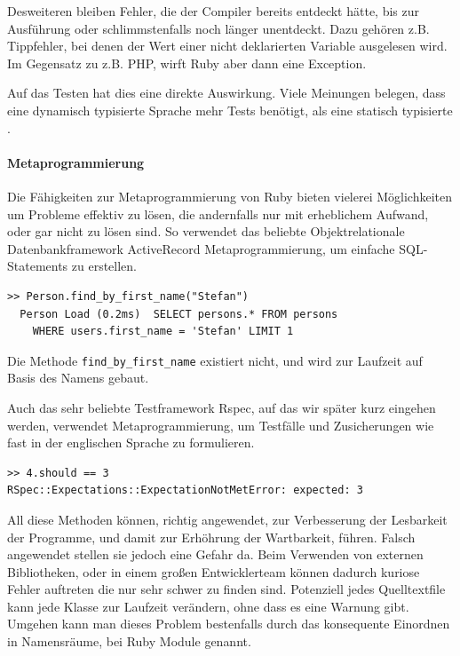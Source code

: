 Desweiteren bleiben Fehler, die der Compiler bereits entdeckt hätte, bis zur Ausführung oder schlimmstenfalls noch länger unentdeckt. Dazu gehören z.B. Tippfehler, bei denen der Wert einer nicht deklarierten Variable ausgelesen wird. Im Gegensatz zu z.B. PHP, wirft Ruby aber dann eine Exception.

Auf das Testen hat dies eine direkte Auswirkung. Viele Meinungen belegen, dass eine dynamisch typisierte Sprache mehr Tests benötigt, als eine statisch typisierte \citep{daniel_spiewak_dynamic_2010}. 



\paragraph{Metaprogrammierung}
Die Fähigkeiten zur Metaprogrammierung von Ruby bieten vielerei Möglichkeiten um Probleme effektiv zu lösen, die andernfalls nur mit erheblichem Aufwand, oder gar nicht zu lösen sind. So verwendet das beliebte Objektrelationale Datenbankframework ActiveRecord Metaprogrammierung, um einfache SQL-Statements zu erstellen.
\begin{lstlisting}
>> Person.find_by_first_name("Stefan")
  Person Load (0.2ms)  SELECT persons.* FROM persons
    WHERE users.first_name = 'Stefan' LIMIT 1
\end{lstlisting}

Die Methode \texttt{find\_by\_first\_name} existiert nicht, und wird zur Laufzeit auf Basis des Namens gebaut.

Auch das sehr beliebte Testframework Rspec, auf das wir später kurz eingehen werden, verwendet Metaprogrammierung, um Testfälle und Zusicherungen wie fast in der englischen Sprache zu formulieren.

\begin{lstlisting}
>> 4.should == 3
RSpec::Expectations::ExpectationNotMetError: expected: 3
\end{lstlisting}

All diese Methoden können, richtig angewendet, zur Verbesserung der Lesbarkeit der Programme, und damit zur Erhöhrung der Wartbarkeit, führen.
Falsch angewendet stellen sie jedoch eine Gefahr da. Beim Verwenden von externen Bibliotheken, oder in einem großen Entwicklerteam können dadurch kuriose Fehler auftreten die nur sehr schwer zu finden sind. Potenziell jedes Quelltextfile kann jede Klasse zur Laufzeit verändern, ohne dass es eine Warnung gibt. Umgehen kann man dieses Problem bestenfalls durch das konsequente Einordnen in Namensräume, bei Ruby Module genannt.

